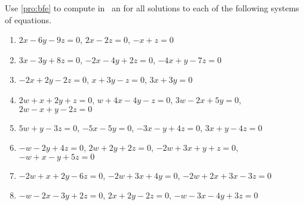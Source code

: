 \begin{exercise} \label{ex:} 
Use \autoref{pro:bfe} to compute in \script\ an  for all solutions to each of the following systems of equations.

\begin{enumerate}
\item \(2x-6y-9z=0\), \(2x-2z=0\), \(-x+z=0\)

\item \(3x-3y+8z=0\), \(-2x-4y+2z=0\), \(-4x+y-7z=0\)

\item \(-2x+2y-2z=0\), \(x+3y-z=0\), \(3x+3y=0\)

\item \(2w+x+2y+z=0\), \(w+4x-4y-z=0\), \(3w-2x+5y=0\), \(2w-x+y-2z=0\)

\item \(5w+y-3z=0\), \(-5x-5y=0\), \(-3x-y+4z=0\), \(3x+y-4z=0\)

\item \(-w-2y+4z=0\), \(2w+2y+2z=0\), \(-2w+3x+y+z=0\), \(-w+x-y+5z=0\)

\item \(-2w+x+2y-6z=0\), \(-2w+3x+4y=0\), \(-2w+2x+3x-3z=0\)

\item \(-w-2x-3y+2z=0\), \(2x+2y-2z=0\), \(-w-3x-4y+3z=0\)

\end{enumerate}
\end{exercise}






